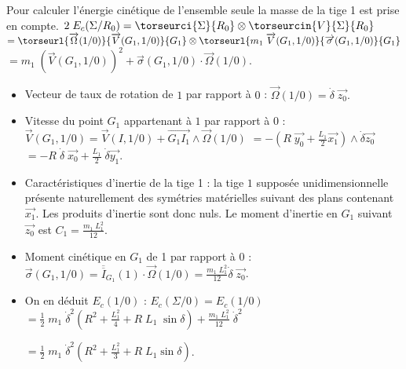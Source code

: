 \ifprof
\begin{corrige}
Pour calculer l'énergie cinétique de l'ensemble seule la masse de la tige 1 est prise en compte.
$
2\;E_c(\Sigma/R_0)=\torseurci{\Sigma}{R_0}\otimes \torseurcin{V}{\Sigma}{R_0}$
$=\torseurl{\overrightarrow{\Omega}(1/0)}{\overrightarrow{V}(G_1,1/0)}{G_1}\otimes \torseurl{m_1\;\overrightarrow{V}(G_1,1/0)}{\overrightarrow{\sigma}(G_1,1/0)}{G_1}$
$=m_1\;\left(\overrightarrow{V}(G_1,1/0)\right)^2+\overrightarrow{\sigma}(G_1,1/0)\cdot \overrightarrow{\Omega}(1/0). 
$

\begin{itemize}
\item Vecteur de taux de rotation de $1$ par rapport à $0$ : $
\overrightarrow{\Omega}(1/0)=\dot{\delta}\;\overrightarrow{z_0}.
$

\item Vitesse du point $G_1$ appartenant à $1$ par rapport à $0$ : $
\overrightarrow{V}(G_1,1/0)=\overrightarrow{V}(I,1/0)+\overrightarrow{G_1I_1}\wedge\overrightarrow{\Omega}(1/0)$
$=-\left(R\;\overrightarrow{y_0}+\frac{L_1}{2}\overrightarrow{x_1}\right)\wedge\dot{\delta}\overrightarrow{z_0}$
$=-R\;\dot{\delta}\;\overrightarrow{x_0}+\frac{L_1}{2}\;\dot{\delta}\overrightarrow{y_1}$.


\item Caractéristiques d'inertie de la tige 1 : la tige $1$ supposée unidimensionnelle présente naturellement des symétries matérielles suivant des plans contenant $\overrightarrow{x_1}$. Les produits d'inertie sont donc nuls. Le moment d'inertie en $G_1$ suivant $\overrightarrow{z_0}$ est $C_1=\frac{m_1\;L_1^2}{12}$.

\item Moment cinétique en $G_1$ de 1 par rapport à 0 : $
\overrightarrow{\sigma}(G_1,1/0)=\overline{\overline{I}}_{G_1}(1)\cdot \overrightarrow{\Omega}(1/0)=\frac{m_1\;L_1^2}{12}\dot{\delta}\;\overrightarrow{z_0}
$.

\item On en déduit $E_c(1/0)$ :
$E_c(\Sigma/0)=E_c(1/0)$
$=\frac{1}{2}\;m_1\;\dot{\delta}^2\left(R^2+\frac{L_1^2}{4}+R\;L_1\;\sin\delta\right)+\frac{m_1\;L_1^2}{12}\;\dot{\delta}^2$

$=\frac{1}{2}\;m_1\;\dot{\delta}^2\left(R^2+\frac{L_1^2}{3}+R\;L_1\sin\delta\right)$.
\end{itemize}
\end{corrige}
\else
\fi

